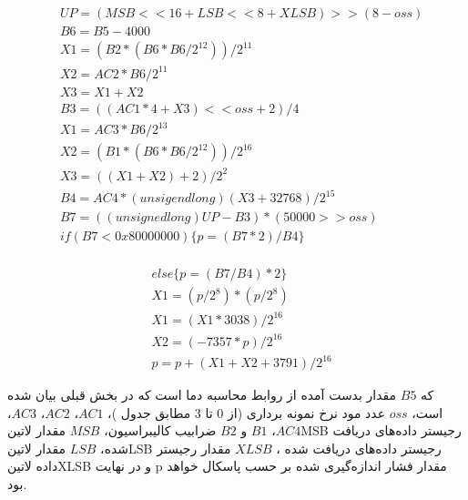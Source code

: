 \begin{fleqn}
	\begin{equation*}
	\begin{split}
		&UP = (MSB<<16 + LSB<<8 + XLSB) >> (8-oss) \\
		&B6 = B5 - 4000 \\
		&X1 = (B2 * (B6 * B6 / 2^{12} )) / 2^{11}\\
		&X2 = AC2 * B6 / 2^{11}\\
		&X3 = X1 + X2\\
		&B3 = ((AC1*4+X3) << oss + 2) / 4\\
		&X1 = AC3 * B6 / 2^{13}\\
		&X2 = (B1 * (B6 * B6 / 2^{12} )) / 2^{16}\\
		&X3 = ((X1 + X2) + 2) / 2^2\\
		&B4 = AC4 * (unsigend long)(X3 + 32768) / 2^{15}\\
		&B7 = ((unsigned long)UP - B3) * (50000 >> oss)\\
		&if (B7 < 0x80000000) \{ p = (B7 * 2) / B4 \}\\
	\end{split}
	\end{equation*}
\end{fleqn}

\begin{fleqn}
	\begin{equation*}
	\begin{split}
		&else \{ p = (B7 / B4) * 2 \}\\
		&X1 = (p / 2^8 ) * (p / 2^8 )\\
		&X1 = (X1 * 3038) / 2^{16}\\
		&X2 = (-7357 * p) / 2^{16}\\
		&p = p + (X1 + X2 + 3791) / 2^{16}
		\end{split}
	\end{equation*}
\end{fleqn}
\noindent
که $B5$ مقدار بدست آمده از روابط محاسبه دما است که در بخش قبلی بیان شده است، $oss$ عدد مود نرخ نمونه برداری (از 0 تا 3 مطابق جدول )، $AC1$، $AC2$، $AC3$، $AC4$، $B1$ و $B2$ ضرابیب کالیبراسیون، $MSB$ مقدار ‌لاتین{MSB} رجیستر داده‌های دریافت شده، $LSB$ مقدار ‌لاتین{LSB} رجیستر داده‌های دریافت شده ، $XLSB$ مقدار رجیستر داده ‌لاتین{XLSB} و در نهایت p مقدار فشار اندازه‌گیری شده بر حسب پاسکال خواهد بود. 

